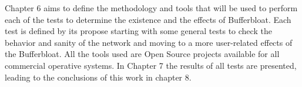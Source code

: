 Chapter 6 aims to define the methodology and tools that will be used to
perform each of the tests to determine the existence and the effects of
Bufferbloat. Each test is defined by its propose starting with some general
tests to check the behavior and sanity of the network and moving to a more
user-related effects of the Bufferbloat. All the tools used are Open Source
projects available for all commercial operative systems. In Chapter 7 the
results of all tests are presented, leading to the conclusions of this work in
chapter 8.
